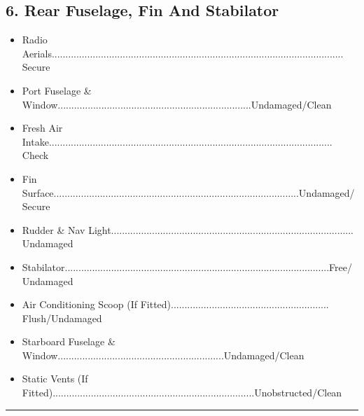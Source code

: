 \documentclass[a4paper]{article}
\newenvironment{checklist}{
  \begin{itemize}[leftmargin=*, align=left]
    \setlength{\itemsep}{2pt}
    \setlength{\parskip}{0pt}
    \setlength{\parsep}{0pt}
}{
  \end{itemize}
}
\begin{document}
\subsection*{6. Rear Fuselage, Fin And Stabilator}
\begin{checklist}
\item Radio Aerials........................................................................................................... Secure
\item Port Fuselage \& Window.......................................................................Undamaged/Clean
\item Fresh Air Intake........................................................................................................ Check
\item Fin Surface..........................................................................................Undamaged/Secure
\item Rudder \& Nav Light......................................................................................... Undamaged
\item Stabilator.................................................................................................Free/Undamaged
\item Air Conditioning Scoop (If Fitted).......................................................... Flush/Undamaged
\item Starboard Fuselage \& Window.............................................................Undamaged/Clean
\item Static Vents (If Fitted)..........................................................................Unobstructed/Clean
\end{checklist}

\rule{\linewidth}{0.4pt}
\end{document}
